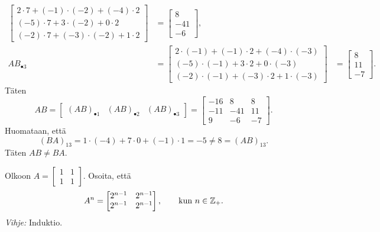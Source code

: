 \documentclass[11pt,a4paper]{amsart}
\begin{document}
\begin{solution}
\[\begin{aligned}
\begin{bmatrix}
        2\cdot 7 + (-1)\cdot(-2) + (-4)\cdot 2 \\
        (-5)\cdot 7 + 3\cdot(-2) + 0\cdot 2 \\
        (-2)\cdot 7 + (-3)\cdot(-2) + 1\cdot 2
      \end{bmatrix}
      &=
      \begin{bmatrix}
        8 \\
        -41 \\
        -6
      \end{bmatrix}, \\
      AB_{\bullet 3} &=
      \begin{bmatrix}
        2\cdot(-1) + (-1)\cdot 2 + (-4)\cdot(-3) \\
        (-5)\cdot(-1) + 3\cdot 2 + 0\cdot(-3) \\
        (-2)\cdot(-1) + (-3)\cdot 2 + 1\cdot(-3)
      \end{bmatrix}
      &=
      \begin{bmatrix}
        8 \\
        11 \\
        -7
      \end{bmatrix}.
    \end{aligned}
  \]
  Täten
  \[
    AB =
    \begin{bmatrix}
      (AB)_{\bullet 1} & (AB)_{\bullet 2} & (AB)_{\bullet 3}
    \end{bmatrix} =
    \begin{bmatrix}
      -16 & 8 & 8 \\
      -11 & -41 & 11 \\
      9 & -6 & -7
    \end{bmatrix}.
  \]
  Huomataan, että
  \[
    (BA)_{13} = 1\cdot(-4) + 7\cdot 0 + (-1)\cdot 1
    = -5 \neq 8 = (AB)_{13}.
  \]
  Täten \(AB \neq BA\).
\end{solution}

\begin{exercise}
  Olkoon \(A =
    \begin{bmatrix} 1 & 1 \\ 1 & 1
  \end{bmatrix}\).
  Osoita, että
  \[
    A^n =
    \begin{bmatrix}
      2^{n-1} & 2^{n-1} \\
      2^{n-1} & 2^{n-1}
    \end{bmatrix},
    \qquad\text{kun } n \in \mathbb{Z}_+.
  \]
  \textit{Vihje:} Induktio.
\end{exercise}
\end{document}
